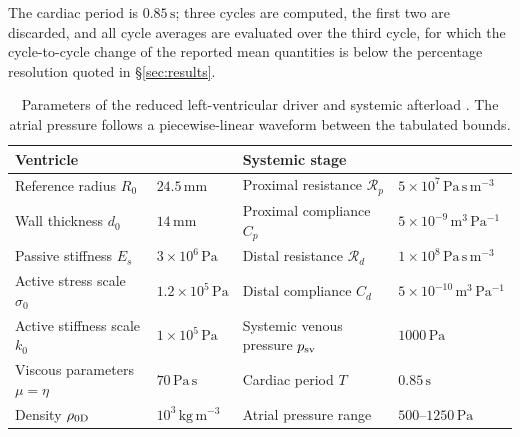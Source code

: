 \documentclass[lineno]{jfm}
\begin{document}
The cardiac period is $0.85\,\mathrm{s}$; three cycles are computed, the
first two are discarded, and all cycle averages are evaluated over the third
cycle, for which the cycle-to-cycle change of the reported mean quantities is
below the percentage resolution quoted in \S\ref{sec:results}.
\begin{table}
  \centering
  \caption{Parameters of the reduced left-ventricular driver and systemic
  afterload \citep{chapelle2012energy,caruel2014dimensional}. The atrial
  pressure follows a piecewise-linear waveform between the tabulated bounds.}
  \label{tab:lv-parameters}
  \begin{tabular}{llll}
    \toprule
    Ventricle & & Systemic stage & \\
    \midrule
    Reference radius $R_0$ & $24.5\,\mathrm{mm}$ &
      Proximal resistance $\mathcal{R}_p$ & $5\times10^{7}\,\mathrm{Pa\,s\,m^{-3}}$ \\
    Wall thickness $d_0$ & $14\,\mathrm{mm}$ &
      Proximal compliance $C_p$ & $5\times10^{-9}\,\mathrm{m^{3}\,Pa^{-1}}$ \\
    Passive stiffness $E_s$ & $3\times10^{6}\,\mathrm{Pa}$ &
      Distal resistance $\mathcal{R}_d$ & $1\times10^{8}\,\mathrm{Pa\,s\,m^{-3}}$ \\
    Active stress scale $\sigma_0$ & $1.2\times10^{5}\,\mathrm{Pa}$ &
      Distal compliance $C_d$ & $5\times10^{-10}\,\mathrm{m^{3}\,Pa^{-1}}$ \\
    Active stiffness scale $k_0$ & $1\times10^{5}\,\mathrm{Pa}$ &
      Systemic venous pressure $p_{\rm sv}$ & $1000\,\mathrm{Pa}$ \\
    Viscous parameters $\mu=\eta$ & $70\,\mathrm{Pa\,s}$ &
      Cardiac period $T$ & $0.85\,\mathrm{s}$ \\
    Density $\rho_{\rm 0D}$ & $10^{3}\,\mathrm{kg\,m^{-3}}$ &
      Atrial pressure range & $500$--$1250\,\mathrm{Pa}$ \\
    \bottomrule
  \end{tabular}
\end{table}
\end{document}
